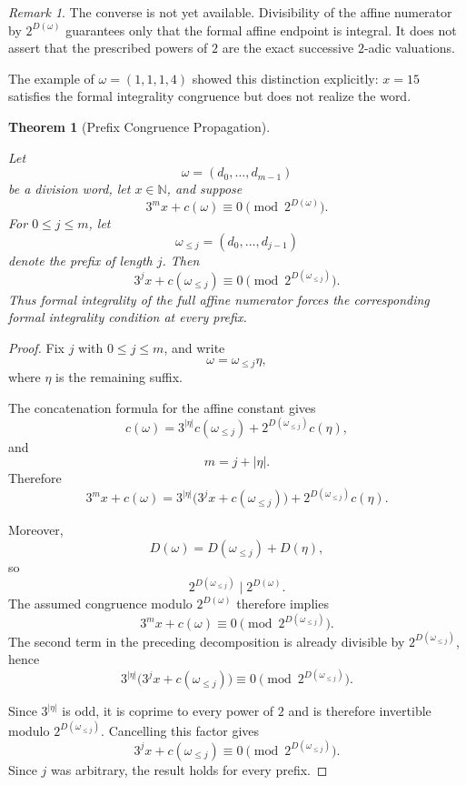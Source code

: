 \documentclass[12pt, oneside]{article}
\numberwithin{equation}{section}
\theoremstyle{definition}
\theoremstyle{plain}
\newtheorem{theorem}{Theorem}[section]
\theoremstyle{remark}
\newtheorem*{remark}{Remark}
\begin{document}
\begin{remark}
The converse is not yet available. Divisibility of the affine numerator by
\(2^{D(\omega)}\) guarantees only that the formal affine endpoint is
integral. It does not assert that the prescribed powers of \(2\) are the
exact successive \(2\)-adic valuations.

The example of \(\omega=(1,1,1,4)\) showed this distinction explicitly:
\(x=15\) satisfies the formal integrality congruence but does not realize
the word.
\end{remark}

\begin{theorem}[Prefix Congruence Propagation]
\label{thm:prefix-congruence-propagation}

Let
\[
\omega=(d_0,\dots,d_{m-1})
\]
be a division word, let \(x\in\mathbb N\), and suppose
\[
3^m x+c(\omega)
\equiv
0
\pmod{2^{D(\omega)}}.
\]
For \(0\le j\le m\), let
\[
\omega_{\le j}
=
(d_0,\dots,d_{j-1})
\]
denote the prefix of length \(j\). Then
\[
3^j x+c(\omega_{\le j})
\equiv
0
\pmod{2^{D(\omega_{\le j})}}.
\]
Thus formal integrality of the full affine numerator forces the
corresponding formal integrality condition at every prefix.
\end{theorem}

\begin{proof}
Fix \(j\) with \(0\le j\le m\), and write
\[
\omega=\omega_{\le j}\eta,
\]
where \(\eta\) is the remaining suffix.

The concatenation formula for the affine constant gives
\[
c(\omega)
=
3^{|\eta|}c(\omega_{\le j})
+
2^{D(\omega_{\le j})}c(\eta),
\]
and
\[
m=j+|\eta|.
\]
Therefore
\[
3^m x+c(\omega)
=
3^{|\eta|}
\bigl(3^j x+c(\omega_{\le j})\bigr)
+
2^{D(\omega_{\le j})}c(\eta).
\]

Moreover,
\[
D(\omega)
=
D(\omega_{\le j})+D(\eta),
\]
so
\[
2^{D(\omega_{\le j})}
\mid
2^{D(\omega)}.
\]
The assumed congruence modulo \(2^{D(\omega)}\) therefore implies
\[
3^m x+c(\omega)
\equiv
0
\pmod{2^{D(\omega_{\le j})}}.
\]
The second term in the preceding decomposition is already divisible by
\(2^{D(\omega_{\le j})}\), hence
\[
3^{|\eta|}
\bigl(3^j x+c(\omega_{\le j})\bigr)
\equiv
0
\pmod{2^{D(\omega_{\le j})}}.
\]

Since \(3^{|\eta|}\) is odd, it is coprime to every power of \(2\) and is
therefore invertible modulo \(2^{D(\omega_{\le j})}\). Cancelling this
factor gives
\[
3^j x+c(\omega_{\le j})
\equiv
0
\pmod{2^{D(\omega_{\le j})}}.
\]
Since \(j\) was arbitrary, the result holds for every prefix.
\end{proof}
\end{document}
